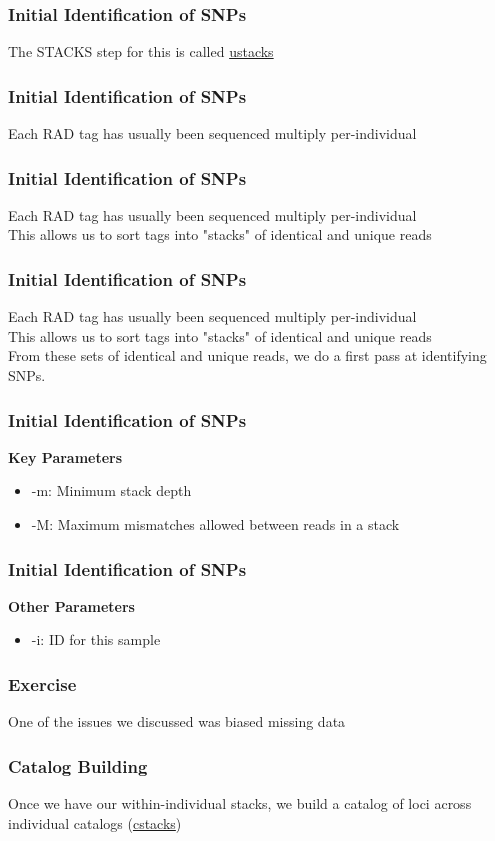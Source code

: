 \documentclass{beamer}
\begin{document}
\begin{frame}
\frametitle{Initial Identification of SNPs}
The STACKS step for this is called \href{http://catchenlab.life.illinois.edu/stacks/comp/ustacks.php}{ustacks}
\end{frame}

\begin{frame}
\frametitle{Initial Identification of SNPs}
Each RAD tag has usually been sequenced multiply per-individual
\end{frame}

\begin{frame}
\frametitle{Initial Identification of SNPs}
Each RAD tag has usually been sequenced multiply per-individual \\
This allows us to sort tags into "stacks" of identical and unique reads
\end{frame}

\begin{frame}
\frametitle{Initial Identification of SNPs}
Each RAD tag has usually been sequenced multiply per-individual \\
This allows us to sort tags into "stacks" of identical and unique reads \\
From these sets of identical and unique reads, we do a first pass at identifying SNPs.
\end{frame}

\begin{frame}
\frametitle{Initial Identification of SNPs}
\textbf{Key Parameters}
\begin{itemize}
\item -m: Minimum stack depth
\item -M: Maximum mismatches allowed between reads in a stack
\end{itemize}
\end{frame}

\begin{frame}
\frametitle{Initial Identification of SNPs}
\textbf{Other Parameters}
\begin{itemize}
\item -i: ID for this sample
\end{itemize}
\end{frame}

\begin{frame}
\frametitle{Exercise}
One of the issues we discussed was biased missing data
\end{frame}

\begin{frame}
\frametitle{Catalog Building}
Once we have our within-individual stacks, we build a catalog of loci across individual catalogs (\href{http://catchenlab.life.illinois.edu/stacks/comp/cstacks.php}{cstacks})
\end{frame}
\end{document}
